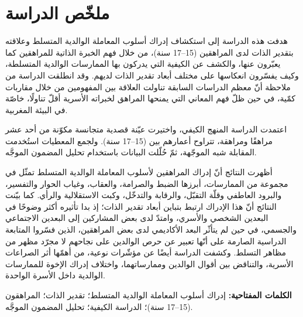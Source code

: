 \documentclass[12pt,oneside]{report}
\begin{document}
\chapter*{ملخّص الدراسة}
هدفت هذه الدراسة إلى استكشاف إدراك أسلوب المعاملة الوالدية المتسلط وعلاقته بتقدير الذات لدى
المراهقين (15--17 سنة)، من خلال فهم الخبرة الذاتية للمراهقين كما يعبّرون عنها، والكشف عن الكيفية
التي يدركون بها الممارسات الوالدية المتسلطة، وكيف يفسّرون انعكاسها على مختلف أبعاد تقدير الذات
لديهم. وقد انطلقت الدراسة من ملاحظة أنّ معظم الدراسات السابقة تناولت العلاقة بين المفهومين من
خلال مقاربات كمّية، في حين ظلّ فهم المعاني التي يمنحها المراهق لخبراته الأسرية أقلّ تناولًا،
خاصّة في البيئة المغربية.\par
اعتمدت الدراسة المنهج الكيفي، واختيرت عيّنة قصدية متجانسة مكوّنة من أحد عشر مراهقًا ومراهقة،
تتراوح أعمارهم بين (15--17 سنة). ولجمع المعطيات استُخدمت المقابلة شبه الموجّهة، ثمّ حُلّلت
البيانات باستخدام تحليل المضمون الموجَّه.\par
أظهرت النتائج أنّ إدراك المراهقين لأسلوب المعاملة الوالدية المتسلط تمثّل في مجموعة من الممارسات،
أبرزها الضبط والصرامة، والعقاب، وغياب الحوار والتفسير، والبرود العاطفي وقلّة التقبّل، والرقابة
والتدخّل، وكبت الاستقلالية والرأي. كما بيّنت النتائج أنّ هذا الإدراك ارتبط بتباين أبعاد تقدير
الذات؛ إذ بدا تأثيره أكثر وضوحًا في البعدين الشخصي والأسري، وامتدّ لدى بعض المشاركين إلى البعدين
الاجتماعي والجسمي، في حين لم يتأثّر البعد الأكاديمي لدى بعض المراهقين، الذين فسّروا المتابعة
الدراسية الصارمة على أنّها تعبير عن حرص الوالدين على نجاحهم لا مجرّد مظهر من مظاهر التسلط.
وكشفت الدراسة أيضًا عن مؤشّرات نوعية، من أهمّها أثر الصراعات الأسرية، والتناقض بين أقوال الوالدين
وممارساتهما، واختلاف إدراك الإخوة للممارسات الوالدية داخل الأسرة الواحدة.\par
\noindent\textbf{الكلمات المفتاحية:} إدراك أسلوب المعاملة الوالدية المتسلط؛ تقدير الذات؛
المراهقون (15--17 سنة)؛ الدراسة الكيفية؛ تحليل المضمون الموجَّه.

\end{document}
